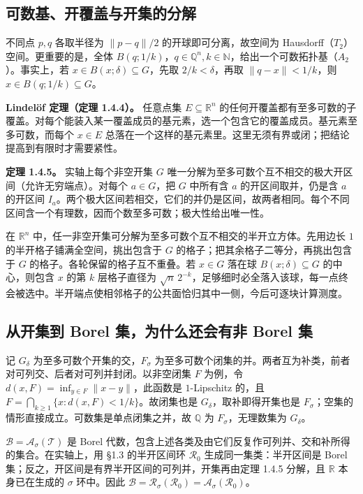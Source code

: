 \documentclass[11pt,a4paper]{article}
\begin{document}
\subsection{可数基、开覆盖与开集的分解}

不同点 \(p,q\) 各取半径为 \(\|p-q\|/2\) 的开球即可分离，故空间为 Hausdorff（\(T_2\)）空间。更重要的是，全体 \(B(q;1/k)\)，\(q\in\mathbb Q^n,k\in\mathbb N\)，给出一个可数拓扑基（\(A_2\)）。事实上，若 \(x\in B(x;\delta)\subseteq G\)，先取 \(2/k<\delta\)，再取 \(\|q-x\|<1/k\)，则 \(x\in B(q;1/k)\subseteq G\)。

\textbf{Lindelöf 定理（定理 1.4.4）。} 任意点集 \(E\subseteq\mathbb R^n\) 的任何开覆盖都有至多可数的子覆盖。对每个能装入某一覆盖成员的基元素，选一个包含它的覆盖成员。基元素至多可数，而每个 \(x\in E\) 总落在一个这样的基元素里。这里无须有界或闭；把结论提高到有限时才需要紧性。

\textbf{定理 1.4.5。} 实轴上每个非空开集 \(G\) 唯一分解为至多可数个互不相交的极大开区间（允许无穷端点）。对每个 \(a\in G\)，把 \(G\) 中所有含 \(a\) 的开区间取并，仍是含 \(a\) 的开区间 \(I_a\)。两个极大区间若相交，它们的并仍是区间，故两者相同。每个不同区间含一个有理数，因而个数至多可数；极大性给出唯一性。

在 \(\mathbb R^n\) 中，任一非空开集可分解为至多可数个互不相交的半开立方体。先用边长 \(1\) 的半开格子铺满全空间，挑出包含于 \(G\) 的格子；把其余格子二等分，再挑出包含于 \(G\) 的格子。各轮保留的格子互不重叠。若 \(x\in G\) 落在球 \(B(x;\delta)\subseteq G\) 的中心，则包含 \(x\) 的第 \(k\) 层格子直径为 \(\sqrt n\,2^{-k}\)，足够细时必全落入该球，每一点终会被选中。半开端点使相邻格子的公共面恰归其中一侧，今后可逐块计算测度。

\subsection{从开集到 Borel 集，为什么还会有非 Borel 集}

记 \(G_\delta\) 为至多可数个开集的交，\(F_\sigma\) 为至多可数个闭集的并。两者互为补类，前者对可列交、后者对可列并封闭。以非空闭集 \(F\) 为例，令 \(d(x,F)=\inf_{y\in F}\|x-y\|\)，此函数是 \(1\)-Lipschitz 的，且 \(F=\bigcap_{k\ge1}\{x:d(x,F)<1/k\}\)。故闭集也是 \(G_\delta\)，取补即得开集也是 \(F_\sigma\)；空集的情形直接成立。可数集是单点闭集之并，故 \(\mathbb Q\) 为 \(F_\sigma\)，无理数集为 \(G_\delta\)。

\(\mathcal B=\mathcal A_\sigma(\mathcal T)\) 是 Borel 代数，包含上述各类及由它们反复作可列并、交和补所得的集合。在实轴上，用 §1.3 的半开区间环 \(\mathcal R_0\) 生成同一集类：半开区间是 Borel 集；反之，开区间是有界半开区间的可列并，开集再由定理 1.4.5 分解，且 \(\mathbb R\) 本身已在生成的 \(\sigma\) 环中。因此 \(\mathcal B=\mathcal R_\sigma(\mathcal R_0)=\mathcal A_\sigma(\mathcal R_0)\)。
\end{document}
